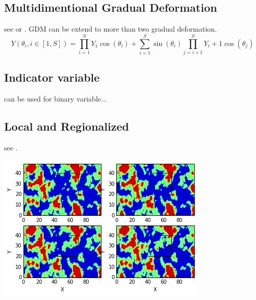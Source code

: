 \documentclass{article}
\newenvironment{Figure}
  {\par\medskip\noindent\minipage{\linewidth}}
  {\endminipage\par\medskip}
\begin{document}
\begin{multicols}{2}
\subsection{Multidimentional Gradual Deformation}
see \cite{Hu2000} or \cite{LeRavalec-Dupin2002}. GDM can be extend to more than two gradual deformation.
\[ Y(\theta_i , i \in [1,S] ) = \prod_{i=1}^S Y_1 \cos (\theta_i)    + \sum_{i=1}^S \sin (\theta_i) \prod_{j=i+1}^S Y_i+1 \cos (\theta_j) \]

\subsection{Indicator variable}
can be used for binary variable...

\subsection{Local and Regionalized}
see \cite{Hu2000}.
\begin{Figure}
 \centering
 \includegraphics[width=\linewidth]{grad_def_ex_2}
\end{Figure}


\end{multicols}
\end{document}
